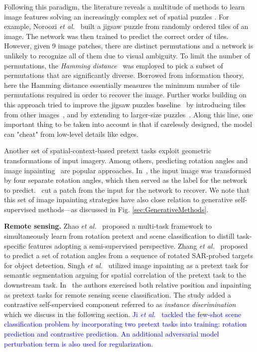 \documentclass[lettersize,journal]{IEEEtran}
\newcommand{\etal}{\textit{et al.}}
\begin{document}
Following this paradigm, the literature reveals a multitude of methods to learn image features solving an increasingly complex set of spatial puzzles
\cite{noroozi2016unsupervised,wei2019iterative,noroozi2018boosting,santa2018visual,Chen_2021_CVPR}. For example, Noroozi \etal~\cite{noroozi2016unsupervised} built a jigsaw puzzle from randomly ordered tiles of an image. The network was then trained to predict the correct order of tiles. However, given 9 image patches, there are  distinct permutations and a network is unlikely to recognize all of them due to visual ambiguity. To limit the number of permutations, the
\textit{Hamming distance}~\cite{6772729} was employed to pick a subset of permutations that are significantly diverse. Borrowed from information theory, here the Hamming distance essentially measures the minimum number of tile permutations required in order to recover the image. Further works building on this approach tried to improve the jigsaw puzzles baseline~\cite{wei2019iterative} by introducing tiles from other images~\cite{noroozi2018boosting,Chen_2021_CVPR}, and by
extending to larger-size puzzles~\cite{santa2018visual}. Along this line, one important thing to be taken into account is that if carelessly designed, the model can "cheat" from low-level details like edges.

Another set of spatial-context-based pretext tasks exploit geometric transformations of input imagery. Among others, predicting rotation angles
\cite{gidaris2018unsupervised,feng2019self} and image inpainting~\cite{pathak2016context,iizuka2017globally}
are popular approaches. In~\cite{gidaris2018unsupervised}, the input image was transformed by four separate rotation angles, which then served as the label for the network to predict.~\cite{pathak2016context} cut a patch from the input for the network to recover. We note that this set of image inpainting strategies have also close relation to generative self-supervised methods---as discussed in Fig. \ref{sec:GenerativeMethods}.

\textbf{Remote sensing.} Zhao \etal~\cite{zhao2020self} proposed a multi-task framework to simultaneously learn from rotation pretext and scene classification to distill task-specific features adopting a semi-supervised perspective. Zhang \etal~\cite{zhang2019rotation} proposed to predict a set of rotation angles from a sequence of rotated SAR-probed targets for object detection. Singh \etal~\cite{singh2018self} utilized image inpainting as a pretext task for semantic segmentation arguing for spatial correlation of the pretext task to the downstream task. In~\cite{tao2020remote} the authors exercised both relative position and inpainting as pretext tasks for remote sensing scene classification. The study added a contrastive self-supervised component referred to as \textit{instance discrimination} which
we discuss in the following section. \textcolor{blue}{Ji \etal~\cite{ji2022few} tackled the few-shot scene classification problem by incorporating two pretext tasks into training: rotation prediction and contrastive prediction. An additional adversarial model perturbation term is also used for regularization.} 
\end{document}
